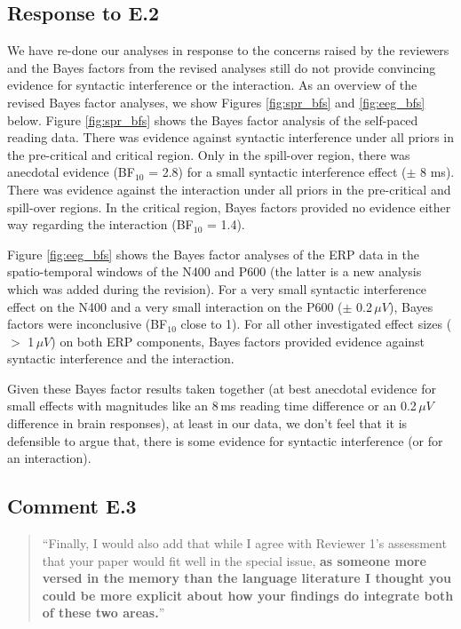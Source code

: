 \documentclass[12pt]{article}
\begin{document}
\subsection*{Response to E.2}
We have re-done our analyses in response to the concerns raised by the reviewers and the Bayes factors from the revised analyses still do not provide convincing evidence for syntactic interference or the interaction. As an overview of the revised Bayes factor analyses, we show Figures \ref{fig:spr_bfs} and \ref{fig:eeg_bfs} below. Figure \ref{fig:spr_bfs} shows the Bayes factor analysis of the self-paced reading data. There was evidence against syntactic interference under all priors in the pre-critical and critical region. Only in the spill-over region, there was anecdotal evidence (BF$_{10}$ = 2.8) for a small syntactic interference effect ($\pm$ 8 ms). There was evidence against the interaction under all priors in the pre-critical and spill-over regions. In the critical region, Bayes factors provided no evidence either way regarding the interaction (BF$_{10}$ = 1.4). 

\setcounter{figure}{4}

Figure \ref{fig:eeg_bfs} shows the Bayes factor analyses of the ERP data in the spatio-temporal windows of the N400 and P600 (the latter is a new analysis which was added during the revision). For a very small syntactic interference effect on the N400 and a very small interaction on the P600 ($\pm$ 0.2\,$\mu V$), Bayes factors were inconclusive (BF$_{10}$ close to 1). For all other investigated effect sizes ($>$ 1\,$\mu V$) on both ERP components, Bayes factors provided evidence against syntactic interference and the interaction.  

Given these Bayes factor results taken together (at best anecdotal evidence for small effects with magnitudes like an 8\,ms reading time difference or an 0.2\,$\mu V$ difference in brain responses), at least in our data, we don't feel that it is defensible to argue that, there is some evidence for syntactic interference (or for an interaction). 

\setcounter{figure}{10}

\subsection*{Comment E.3}
\begin{quote}
``Finally, I would also add that while I agree with Reviewer 1's assessment that your paper would fit well in the special issue, \textbf{as someone more versed in the memory than the language literature I thought you could be more explicit about how your findings do integrate both of these two areas.}''
\end{quote}
\end{document}
